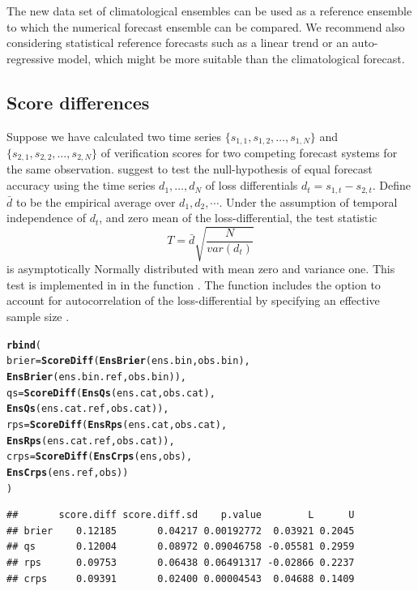 \documentclass[article]{jss}\usepackage{graphicx, color}
\makeatletter
\newcommand{\hlfunctioncall}[1]{\textcolor[rgb]{0,0.501960784313725,0.752941176470588}{\textbf{#1}}}%
\newenvironment{kframe}{%
 \def\at@end@of@kframe{}%
 \ifinner\ifhmode%
  \def\at@end@of@kframe{\end{minipage}}%
  \begin{minipage}{\columnwidth}%
 \fi\fi%
 \def\FrameCommand##1{\hskip\@totalleftmargin \hskip-\fboxsep
 \colorbox{shadecolor}{##1}\hskip-\fboxsep
     \hskip-\linewidth \hskip-\@totalleftmargin \hskip\columnwidth}%
 \MakeFramed {\advance\hsize-\width
   \@totalleftmargin\z@ \linewidth\hsize
   \@setminipage}}%
 {\par\unskip\endMakeFramed%
 \at@end@of@kframe}
\newenvironment{knitrout}{}{} %
\makeatother
\begin{document}
The new data set of climatological ensembles can be used as a reference ensemble to which the numerical forecast ensemble can be compared.
We recommend also considering statistical reference forecasts such as a linear trend or an auto-regressive model, which might be more suitable than the climatological forecast.



\subsection{Score differences}

Suppose we have calculated two time series $\{s_{1,1}, s_{1,2}, \dots, s_{1,N}\}$ and $\{s_{2,1}, s_{2,2}, \dots, s_{2,N}\}$ of verification scores for two competing forecast systems for the same observation.
\citet{diebold1995comparing} suggest to test the null-hypothesis of equal forecast accuracy using the time series $d_1, \dots, d_N$ of loss differentials $d_t = s_{1,t} - s_{2,t}$. 
Define $\bar{d}$ to be the empirical average over $d_1, d_2, \cdots$.
Under the assumption of temporal independence of $d_t$, and zero mean of the loss-differential, the test statistic 
%
\begin{equation}
T = \bar{d}\sqrt{\frac{N}{var(d_t)}}
\end{equation}
%
is asymptotically Normally distributed with mean zero and variance one.
This test is implemented in  in the function .
The function includes the option to account for autocorrelation of the loss-differential by specifying an effective sample size .

\begin{knitrout}
\color{fgcolor}\begin{kframe}
\begin{alltt}
\hlfunctioncall{rbind}(
  brier = \hlfunctioncall{ScoreDiff}(\hlfunctioncall{EnsBrier}(ens.bin,     obs.bin), 
                    \hlfunctioncall{EnsBrier}(ens.bin.ref, obs.bin)),
  qs    = \hlfunctioncall{ScoreDiff}(\hlfunctioncall{EnsQs}(   ens.cat,     obs.cat),    
                    \hlfunctioncall{EnsQs}(   ens.cat.ref, obs.cat)),
  rps   = \hlfunctioncall{ScoreDiff}(\hlfunctioncall{EnsRps}(  ens.cat,     obs.cat),   
                    \hlfunctioncall{EnsRps}(  ens.cat.ref, obs.cat)),
  crps  = \hlfunctioncall{ScoreDiff}(\hlfunctioncall{EnsCrps}( ens,         obs),          
                    \hlfunctioncall{EnsCrps}( ens.ref,     obs))
)
\end{alltt}
\begin{verbatim}
##       score.diff score.diff.sd    p.value        L      U
## brier    0.12185       0.04217 0.00192772  0.03921 0.2045
## qs       0.12004       0.08972 0.09046758 -0.05581 0.2959
## rps      0.09753       0.06438 0.06491317 -0.02866 0.2237
## crps     0.09391       0.02400 0.00004543  0.04688 0.1409
\end{verbatim}
\end{kframe}
\end{knitrout}
\end{document}
